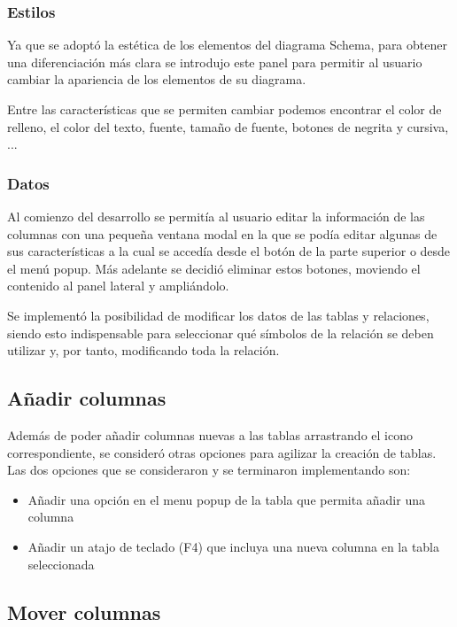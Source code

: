 \subsubsection{Estilos}

Ya que se adoptó la estética de los elementos del diagrama Schema, para obtener una diferenciación más clara se introdujo este panel para permitir al usuario cambiar la apariencia de los elementos de su diagrama.

Entre las características que se permiten cambiar podemos encontrar el color de relleno, el color del texto, fuente, tamaño de fuente, botones de negrita y cursiva, ...

\subsubsection{Datos}

Al comienzo del desarrollo se permitía al usuario editar la información de las columnas con una pequeña ventana modal en la que se podía editar algunas de sus características a la cual se accedía desde el botón de la parte superior o desde el menú popup. Más adelante se decidió eliminar estos botones, moviendo el contenido al panel lateral y ampliándolo.

Se implementó la posibilidad de modificar los datos de las tablas y relaciones, siendo esto indispensable para seleccionar qué símbolos de la relación se deben utilizar y, por tanto, modificando toda la relación.

\subsection{Añadir columnas}

Además de poder añadir columnas nuevas a las tablas arrastrando el icono correspondiente, se consideró otras opciones para agilizar la creación de tablas. Las dos opciones que se consideraron y se terminaron implementando son:
\begin{itemize}
    \item Añadir una opción en el menu popup de la tabla que permita añadir una columna
    \item Añadir un atajo de teclado (F4) que incluya una nueva columna en la tabla seleccionada
\end{itemize}

\subsection{Mover columnas}

